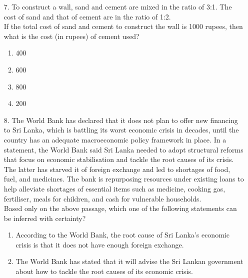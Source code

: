 \documentclass[journal]{IEEEtran}
\begin{document}
\begin{enumerate}
    (iv) No human beings are cruel creatures.\\
    \begin{enumerate}[label = (\Alph*)]
        \item only (i)
        \item only (iii) and (iv)
        \item only (i) and (ii) 
        \item (i), (ii) and (iii)
    \end{enumerate}
    \item[7.] To construct a wall, sand and cement are mixed in the ratio of 3:1. The cost of sand
    and that of cement are in the ratio of 1:2. \\
    If the total cost of sand and cement to construct the wall is 1000 rupees, then what
    is the cost (in rupees) of cement used?
    \begin{enumerate}[label = (\Alph*)]
        \item 400
        \item 600
        \item 800
        \item 200
    \end{enumerate}
    \item[8.] The World Bank has declared that it does not plan to offer new financing to Sri
    Lanka, which is battling its worst economic crisis in decades, until the country has
    an adequate macroeconomic policy framework in place. In a statement, the World
    Bank said Sri Lanka needed to adopt structural reforms that focus on economic
    stabilisation and tackle the root causes of its crisis. The latter has starved it of
    foreign exchange and led to shortages of food, fuel, and medicines. The bank is
    repurposing resources under existing loans to help alleviate shortages of essential
    items such as medicine, cooking gas, fertiliser, meals for children, and cash for
    vulnerable households.\\
    Based only on the above passage, which one of the following statements can be
    inferred with certainty?
    \begin{enumerate}[label = (\Alph*)]
        \item According to the World Bank, the root cause of Sri Lanka’s economic crisis is that
        it does not have enough foreign exchange.
        \item The World Bank has stated that it will advise the Sri Lankan government about how
        to tackle the root causes of its economic crisis.

\end{enumerate}
\end{enumerate}
\end{document}
